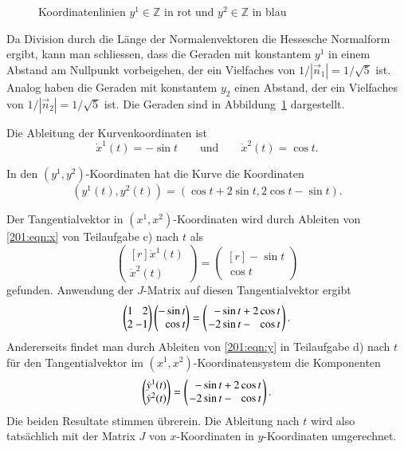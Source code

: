 \begin{loesung}
\begin{teilaufgaben}
\begin{figure}
\caption{Koordinatenlinien $y^1\in\mathbb{Z}$ in rot und 
$y^2\in\mathbb{Z}$ in blau
\label{buch:201:fig}}
\end{figure}%
Da Division durch die Länge der Normalenvektoren die Hessesche
Normalform ergibt, kann man schliessen, dass die Geraden mit
konstantem $y^1$ in einem Abstand am Nullpunkt vorbeigehen, 
der ein Vielfaches von $1/|\vec{n}_1|=1/\sqrt{5}$ ist.
Analog haben die Geraden mit konstantem $y_2$ einen Abstand,
der ein Vielfaches von $1/|\vec{n}_2|=1/\sqrt{5}$ ist.
Die Geraden sind in Abbildung~\ref{buch:201:fig} dargestellt.
\item
Die Ableitung der Kurvenkoordinaten ist
\begin{equation}
\dot{x}^1(t) = -\sin t
\qquad\text{und}\qquad
\dot{x}^2(t) = \cos t.
\label{201:eqn:x}
\end{equation}
\item
In den $(y^1,y^2)$-Koordinaten hat die Kurve die Koordinaten
\begin{equation}
(y^1(t), y^2(t))
=
(\cos t+2\sin t, 2\cos t - \sin t).
\label{201:eqn:y}
\end{equation}
\item
Der Tangentialvektor in $(x^1,x^2)$-Koordinaten wird durch
Ableiten von \eqref{201:eqn:x} von Teilaufgabe c) nach $t$
als
\[
\begin{pmatrix*}[r]
\dot{x}^1(t)\\
\dot{x}^2(t)
\end{pmatrix*}
=
\begin{pmatrix*}[r]
-\sin t\\
 \cos t
\end{pmatrix*}
\]
gefunden.
Anwendung der $J$-Matrix auf diesen Tangentialvektor ergibt
\[
\begin{pmatrix*}[r]
1 &  2 \\
2 & -1
\end{pmatrix*}
\begin{pmatrix*}[r]
-\sin t\\
 \cos t
\end{pmatrix*}
=
\left(
\renewcommand{\arraycolsep}{1.1pt}
\begin{array}{rcr}
 -\sin t &+& 2\cos t\\
-2\sin t &-&  \cos t
\end{array}
\right).
\]
Andererseits findet man durch Ableiten von \eqref{201:eqn:y} in Teilaufgabe d)
nach $t$ für
den Tangentialvektor im $(x^1,x^2)$-Koordinatensystem die
Komponenten
\[
\begin{pmatrix*}[r]
\dot{y}^1(t)\\
\dot{y}^2(t)
\end{pmatrix*}
=
\left(
\renewcommand{\arraycolsep}{1.1pt}
\begin{array}{rcr}
 -\sin t &+& 2\cos t\\
-2\sin t &-& \cos t
\end{array}
\right).
\]
Die beiden Resultate stimmen übrerein.
Die Ableitung nach $t$ wird also tatsächlich mit der Matrix $J$
von $x$-Koordinaten in $y$-Koordinaten umgerechnet.
\qedhere
\end{teilaufgaben}
\end{loesung}

